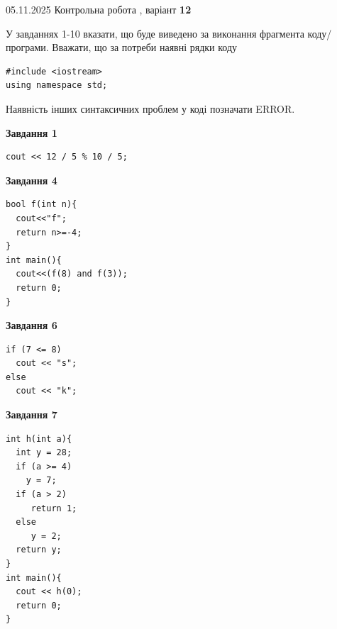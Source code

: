 \documentclass[12pt, ukrainian]{article}
\begin{document}
{\Large{05.11.2025 Контрольна робота , варіант  \No \textbf { 12 }\par}}
{
\begin {large}
У завданнях 1-10 вказати, що буде виведено за виконання фрагмента коду/про\-гра\-ми.
Вважати, що за потреби наявні рядки коду
\begin{verbatim}
#include <iostream>
using namespace std;
\end{verbatim}
Наявність інших синтаксичних проблем у коді позначати ERROR.

\begin{minipage}[t]{7.0cm}

\begin{center}
\textbf{Завдання 1}
\end{center}
\vspace{-8mm}

\begin{verbatim}
cout << 12 / 5 % 10 / 5;
\end{verbatim}



\begin{center}
\textbf{Завдання 4}
\end{center}
\vspace{-8mm}

\begin{verbatim}
bool f(int n){
  cout<<"f";
  return n>=-4;
}
int main(){
  cout<<(f(8) and f(3));
  return 0;
}
\end{verbatim}



\begin{center}
\textbf{Завдання 6}
\end{center}
\vspace{-8mm}

\begin{verbatim}
if (7 <= 8)
  cout << "s";
else
  cout << "k";
\end{verbatim}



\begin{center}
\textbf{Завдання 7}
\end{center}
\vspace{-8mm}

\begin{verbatim}
int h(int a){
  int y = 28;
  if (a >= 4)
    y = 7;
  if (a > 2)
     return 1;
  else
     y = 2;
  return y;
}
int main(){
  cout << h(0);
  return 0;
}
\end{verbatim}


\end{minipage}
\end{large}}
\end{document}
